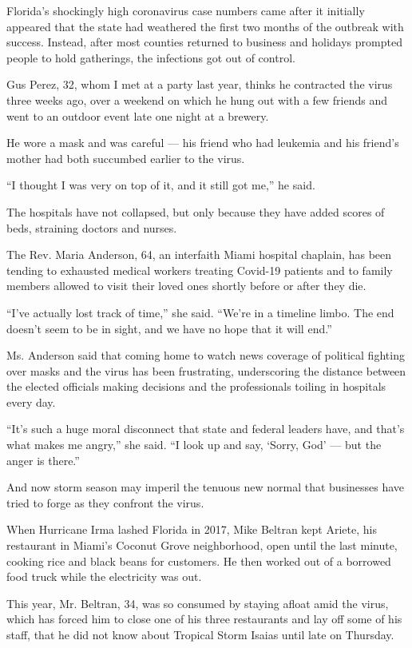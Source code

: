 Florida's shockingly high coronavirus case numbers came after it
initially appeared that the state had weathered the first two months of
the outbreak with success. Instead, after most counties returned to
business and holidays prompted people to hold gatherings, the infections
got out of control.

Gus Perez, 32, whom I met at a party last year, thinks he contracted the
virus three weeks ago, over a weekend on which he hung out with a few
friends and went to an outdoor event late one night at a brewery.

He wore a mask and was careful --- his friend who had leukemia and his
friend's mother had both succumbed earlier to the virus.

``I thought I was very on top of it, and it still got me,'' he said.

The hospitals have not collapsed, but only because they have added
scores of beds, straining doctors and nurses.

The Rev. Maria Anderson, 64, an interfaith Miami hospital chaplain, has
been tending to exhausted medical workers treating Covid-19 patients and
to family members allowed to visit their loved ones shortly before or
after they die.

``I've actually lost track of time,'' she said. ``We're in a timeline
limbo. The end doesn't seem to be in sight, and we have no hope that it
will end.''

Ms. Anderson said that coming home to watch news coverage of political
fighting over masks and the virus has been frustrating, underscoring the
distance between the elected officials making decisions and the
professionals toiling in hospitals every day.

``It's such a huge moral disconnect that state and federal leaders have,
and that's what makes me angry,'' she said. ``I look up and say, `Sorry,
God' --- but the anger is there.''

And now storm season may imperil the tenuous new normal that businesses
have tried to forge as they confront the virus.

When Hurricane Irma lashed Florida in 2017, Mike Beltran kept Ariete,
his restaurant in Miami's Coconut Grove neighborhood, open until the
last minute, cooking rice and black beans for customers. He then worked
out of a borrowed food truck while the electricity was out.

This year, Mr. Beltran, 34, was so consumed by staying afloat amid the
virus, which has forced him to close one of his three restaurants and
lay off some of his staff, that he did not know about Tropical Storm
Isaias until late on Thursday.

